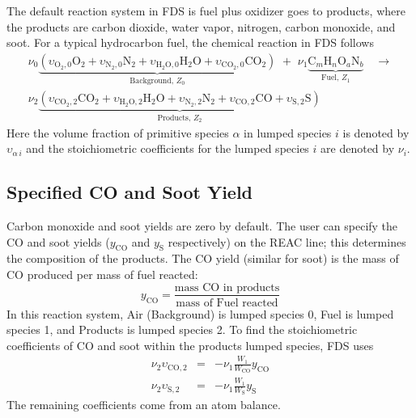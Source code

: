 The default reaction system in FDS is fuel plus oxidizer goes to products, where the products are carbon dioxide, water vapor, nitrogen, carbon monoxide, and soot. For a typical hydrocarbon fuel, the chemical reaction in FDS follows
\begin{multline}\label{eq:full_lump}
\nu_{0}\underbrace{(\upsilon_{\mathrm{O}_{2},0}\mathrm{O}_2 +\upsilon_{\mathrm{N}_{2},0}\mathrm{N}_2 + \upsilon_{\mathrm{H}_{2}\mathrm{O},0}\mathrm{H}_2\mathrm{O}+\upsilon_{\mathrm{CO}_{2},0}\mathrm{CO}_2)}_\text{Background,~$Z_0$} \,\,+ \,\, \nu_{1}\underbrace{\mbox{C}_m\mbox{H}_n\mbox{O}_a\mbox{N}_b}_\text{Fuel,~$Z_1$} \quad \longrightarrow \\
\nu_{2}\underbrace{(\upsilon_{\mathrm{CO}_{2},2}\mathrm{CO}_2+\upsilon_{\mathrm{H}_{2}\mathrm{O},2}\mathrm{H}_2\mathrm{O}+\upsilon_{\mathrm{N}_{2},2}\mathrm{N}_2+\upsilon_{\mathrm{CO},2}\mathrm{CO}+\upsilon_{\mathrm{S},2}\mathrm{S})}_\text{Products,~$Z_2$}
\end{multline}
Here the volume fraction of primitive species $\alpha$ in lumped species $i$ is denoted by $\upsilon_{\alpha\,i}$ and the stoichiometric coefficients for the lumped species $i$ are denoted by $\nu_{i}$.

\subsection{Specified CO and Soot Yield}

Carbon monoxide and soot yields are zero by default. The user can specify the CO and soot yields ($y_{\mathrm{CO}}$ and $y_{\mathrm{S}}$ respectively) on the {\ct REAC} line; this determines the composition of the products. The CO yield (similar for soot) is the mass of CO produced per mass of fuel reacted:
\begin{equation}\label{eq:y_co}
y_\mathrm{CO} = \frac{\mbox{mass CO in products}}{\mbox{mass of Fuel reacted}}
\end{equation}
In this reaction system, Air (Background) is lumped species 0, Fuel is lumped species 1, and Products is lumped species 2. To find the stoichiometric coefficients of CO and soot within the products lumped species, FDS uses
\begin{eqnarray}\label{eq:yields}
\nu_{2}\upsilon_{\mathrm{CO},2}&=&-\nu_{1}\frac{W_1}{W_{\mathrm{CO}}}y_{\mathrm{CO}} \\
\nu_{2}\upsilon_{\mathrm{S},2}&=&-\nu_{1}\frac{W_1}{W_{\mathrm{S}}}y_{\mathrm{S}}
\end{eqnarray}
The remaining coefficients come from an atom balance.

